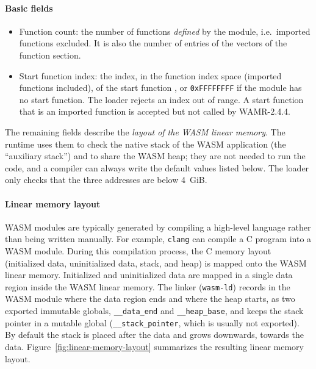 \documentclass{article}
\begin{document}
\paragraph{Basic fields}

\begin{itemize}
\item Function count: the number of functions \emph{defined} by the module, i.e.\ imported functions excluded. It is also the number of entries of the vectors of the function section.
\item Start function index: the index, in the function index space (imported functions included), of the start function \cite[Sec.~5.5.11]{webassembly2019core}, or \verb|0xFFFFFFFF| if the module has no start function.
    The loader rejects an index out of range. A start function that is an imported function is accepted but not called by WAMR-2.4.4.
\end{itemize}

The remaining fields describe the \textit{layout of the WASM linear memory}.
The runtime uses them to check the native stack of the WASM application (the ``auxiliary stack'') and to share the WASM heap; they are not needed to run the code, and a compiler can always write the default values listed below.
The loader only checks that the three addresses are below 4~GiB.

\paragraph{Linear memory layout}

WASM modules are typically generated by compiling a high-level language rather than being written manually. For example, \verb|clang| can compile a C program into a WASM module.
During this compilation process, the C memory layout (initialized data, uninitialized data, stack, and heap) is mapped onto the WASM linear memory.
Initialized and uninitialized data are mapped in a single data region inside the WASM linear memory.
The linker (\texttt{wasm-ld}) records in the WASM module where the data region ends and where the heap starts, as two exported immutable globals, \verb|__data_end| and \verb|__heap_base|, and keeps the stack pointer in a mutable global (\verb|__stack_pointer|, which is usually not exported).
By default the stack is placed after the data and grows downwards, towards the data.
Figure~\ref{fig:linear-memory-layout} summarizes the resulting linear memory layout.
\end{document}
